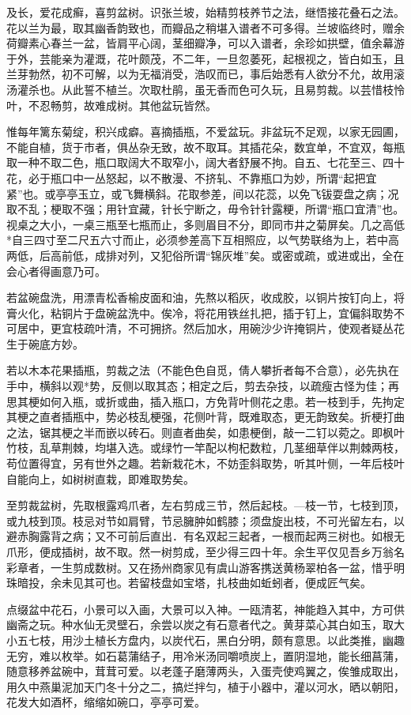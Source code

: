 \documentclass[]{article}
\begin{document}
及长，爱花成癣，喜剪盆树。识张兰坡，始精剪枝养节之法，继悟接花叠石之法。花以兰为最，取其幽香韵致也，而瓣品之稍堪入谱者不可多得。兰坡临终时，赠余荷瓣素心春兰一盆，皆肩平心阔，茎细瓣净，可以入谱者，余珍如拱壁，值余幕游于外，芸能亲为灌溉，花叶颇茂，不二年，一旦忽萎死，起根视之，皆白如玉，且兰芽勃然，初不可解，以为无福消受，浩叹而已，事后始悉有人欲分不允，故用滚汤灌杀也。从此誓不植兰。次取杜鹃，虽无香而色可久玩，且易剪裁。以芸惜枝怜叶，不忍畅剪，故难成树。其他盆玩皆然。

惟每年篱东菊绽，积兴成癖。喜摘插瓶，不爱盆玩。非盆玩不足观，以家无园圃，不能自植，货于市者，俱丛杂无致，故不取耳。其插花朵，数宜单，不宜双，每瓶取一种不取二色，瓶口取阔大不取窄小，阔大者舒展不拘。自五、七花至三、四十花，必于瓶口中一丛怒起，以不散漫、不挤轧、不靠瓶口为妙，所谓``起把宜紧''也。或亭亭玉立，或飞舞横斜。花取参差，间以花蕊，以免飞钹耍盘之病；况取不乱；梗取不强；用针宜藏，针长宁断之，毋令针针露粳，所谓``瓶口宜清''也。视桌之大小，一桌三瓶至七瓶而止，多则眉目不分，即同市井之菊屏矣。几之高低*自三四寸至二尺五六寸而止，必须参差高下互相照应，以气势联络为上，若中高两低，后高前低，成排对列，又犯俗所谓``锦灰堆''矣。或密或疏，或进或出，全在会心者得画意乃可。

若盆碗盘洗，用漂青松香榆皮面和油，先熬以稻灰，收成胶，以铜片按钉向上，将膏火化，粘铜片于盘碗盆洗中。俟冷，将花用铁丝扎把，插于钉上，宜偏斜取势不可居中，更宜枝疏叶清，不可拥挤。然后加水，用碗沙少许掩铜片，使观者疑丛花生于碗底方妙。

若以木本花果插瓶，剪裁之法（不能色色自觅，倩人攀折者每不合意），必先执在手中，横斜以观*势，反侧以取其态；相定之后，剪去杂技，以疏瘦古怪为佳；再思其梗如何入瓶，或折或曲，插入瓶口，方免背叶侧花之患。若一枝到手，先拘定其梗之直者插瓶中，势必枝乱梗强，花侧叶背，既难取态，更无韵致矣。折梗打曲之法，锯其梗之半而嵌以砖石。则直者曲矣，如患梗倒，敲一二钉以菀之。即枫叶竹枝，乱草荆棘，均堪入选。或绿竹一竿配以枸杞数粒，几茎细草伴以荆棘两枝，苟位置得宜，另有世外之趣。若新栽花木，不妨歪斜取势，听其叶侧，一年后枝叶自能向上，如树树直栽，即难取势矣。

至剪裁盆树，先取根露鸡爪者，左右剪成三节，然后起枝。---枝一节，七枝到顶，或九枝到顶。枝忌对节如肩臂，节忌臃肿如鹤膝；须盘旋出枝，不可光留左右，以避赤胸露背之病；又不可前后直出．有名双起三起者，一根而起两三树也。如根无爪形，便成插树，故不取。然一树剪成，至少得三四十年。余生平仅见吾乡万翁名彩章者，一生剪成数树。又在扬州商家见有虞山游客携送黄杨翠柏各一盆，惜乎明珠暗投，余未见其可也。若留枝盘如宝塔，扎枝曲如蚯蚓者，便成匠气矣。

点缀盆中花石，小景可以入画，大景可以入神。一瓯清茗，神能趋入其中，方可供幽斋之玩。种水仙无灵壁石，余尝以炭之有石意者代之。黄芽菜心其白如玉，取大小五七枝，用沙土植长方盘内，以炭代石，黑白分明，颇有意思。以此类推，幽趣无穷，难以枚举。如石葛蒲结子，用冷米汤同嚼喷炭上，置阴湿地，能长细菖蒲，随意移养盆碗中，茸茸可爱。以老蓬子磨薄两头，入蛋壳使鸡翼之，俟雏成取出，用久中燕巢泥加天门冬十分之二，搞烂拌匀，植于小器中，灌以河水，晒以朝阳，花发大如酒杯，缩缩如碗口，亭亭可爱。
\end{document}
